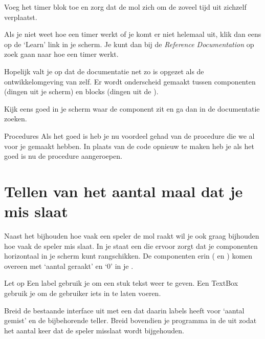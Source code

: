  
\begin{opgave}
    \opgVraag
	Voeg het timer blok toe en zorg dat de mol zich om de zoveel tijd uit zichzelf verplaatst.
\end{opgave}

Als je niet weet hoe een timer werkt of je komt er niet helemaal uit, klik dan eens op de `Learn' link in je  scherm. Je kunt dan bij de \emph{Reference Documentation} op zoek gaan naar hoe een timer werkt.

Hopelijk valt je op dat de documentatie net zo is opgezet als de ontwikkelomgeving van \ai zelf. Er wordt onderscheid gemaakt tussen componenten (dingen uit je  scherm) en blocks (dingen uit de ).

Kijk eens goed in je  scherm waar de  component zit en ga dan in de documentatie zoeken.

\begin{derivation}{Procedures}
Als het goed is heb je nu voordeel gehad van de procedure die we al voor je gemaakt hebben. In plaats van de code opnieuw te maken heb je als het goed is nu de procedure aangeroepen.
\end{derivation}


\section{Tellen van het aantal maal dat je mis slaat}
Naast het bijhouden hoe vaak een speler de mol raakt wil je ook graag bijhouden hoe vaak de speler mis slaat. In je  staat een  die ervoor zorgt dat je componenten horizontaal in je scherm kunt rangschikken. De componenten erin ( en ) komen overeen met `aantal geraakt' en `0' in je .

\begin{derivation}{Let op}
Een label gebruik je om een stuk tekst weer te geven.
Een TextBox gebruik je om de gebruiker iets in te laten voeren.
\end{derivation}

\begin{opgave}
    \opgVraag
	Breid de bestaande interface uit met een  dat daarin labels heeft voor `aantal gemist' en de bijbehorende teller. Breid bovendien je programma in de  uit zodat het aantal keer dat de speler misslaat wordt bijgehouden. 
\end{opgave}


